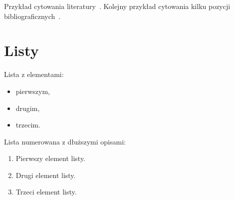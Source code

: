 \documentclass[polish]{aghengthesis}
\newcommand{\listofalgorithmes}{\tocfile{\listalgorithmcfname}{loa}}
\renewcommand\lstlistlistingname{\LangListOfListings}
\renewcommand{\lstlistoflistings}{\begingroup
\tocfile{\lstlistlistingname}{lol}
\endgroup}
\begin{document}
Przykład cytowania literatury~\cite{wilson2009prediction-interday}. Kolejny przykład
cytowania kilku pozycji bibliograficznych~\cite{allen1999using-genetic, zitzler1999evolutionary-algorithms, pictet1995genetic-algorithms, wilhelmstotter2021jenetics, chmaj2015DistributedProcessingApplications}.
\section{Listy}
\label{sec:listy}

Lista z elementami:
\begin{itemize}
\item pierwszym,
\item drugim,
\item trzecim.
\end{itemize}

Lista numerowana z dłuższymi opisami:
\begin{enumerate}
\item Pierwszy element listy.
\item Drugi element listy.
\item Trzeci element listy.
\end{enumerate}

\printbibliography

\listoffigures
\listoftables
\listofalgorithmes
\lstlistoflistings
\end{document}
